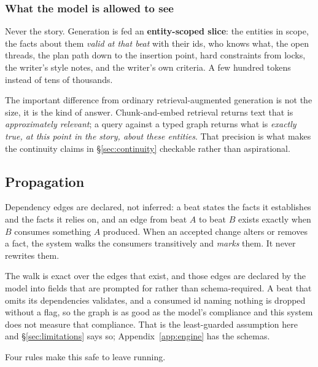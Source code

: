 \documentclass{article}
\begin{document}
\subsubsection{What the model is allowed to see}

Never the story. Generation is fed an \textbf{entity-scoped slice}: the entities in scope,
the facts about them \emph{valid at that beat} with their ids, who knows what, the open
threads, the plan path down to the insertion point, hard constraints from locks, the
writer's style notes, and the writer's own criteria. A few hundred tokens instead of tens
of thousands.

The important difference from ordinary retrieval-augmented generation is not the size, it
is the kind of answer. Chunk-and-embed retrieval returns text that is \emph{approximately
relevant}; a query against a typed graph returns what is \emph{exactly true, at this point
in the story, about these entities}. That precision is what makes the continuity claims in
\S\ref{sec:continuity} checkable rather than aspirational.


\subsection{Propagation}

Dependency edges are declared, not inferred: a beat states the facts it establishes and
the facts it relies on, and an edge from beat $A$ to beat $B$ exists exactly when $B$
consumes something $A$ produced. When an accepted change alters or removes a fact, the
system walks the consumers transitively and \emph{marks} them. It never rewrites them.

The walk is exact over the edges that exist, and those edges are declared by the model into
fields that are prompted for rather than schema-required. A beat that omits its dependencies
validates, and a consumed id naming nothing is dropped without a flag, so the graph is as
good as the model's compliance and this system does not measure that compliance. That is the
least-guarded assumption here and \S\ref{sec:limitations} says so; Appendix~\ref{app:engine}
has the schemas.

Four rules make this safe to leave running.
\end{document}
